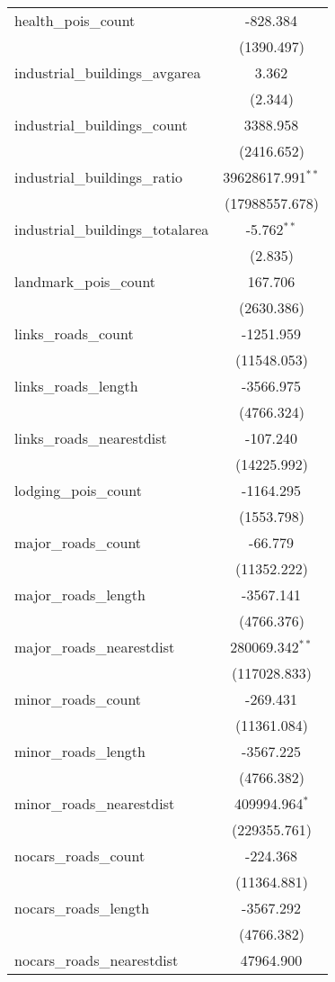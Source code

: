 \begin{table}[!htbp]
\begin{tabular}{@{\extracolsep{5pt}}lc}
 health_pois_count & -828.384$^{}$ \\
  & (1390.497) \\
 industrial_buildings_avgarea & 3.362$^{}$ \\
  & (2.344) \\
 industrial_buildings_count & 3388.958$^{}$ \\
  & (2416.652) \\
 industrial_buildings_ratio & 39628617.991$^{**}$ \\
  & (17988557.678) \\
 industrial_buildings_totalarea & -5.762$^{**}$ \\
  & (2.835) \\
 landmark_pois_count & 167.706$^{}$ \\
  & (2630.386) \\
 links_roads_count & -1251.959$^{}$ \\
  & (11548.053) \\
 links_roads_length & -3566.975$^{}$ \\
  & (4766.324) \\
 links_roads_nearestdist & -107.240$^{}$ \\
  & (14225.992) \\
 lodging_pois_count & -1164.295$^{}$ \\
  & (1553.798) \\
 major_roads_count & -66.779$^{}$ \\
  & (11352.222) \\
 major_roads_length & -3567.141$^{}$ \\
  & (4766.376) \\
 major_roads_nearestdist & 280069.342$^{**}$ \\
  & (117028.833) \\
 minor_roads_count & -269.431$^{}$ \\
  & (11361.084) \\
 minor_roads_length & -3567.225$^{}$ \\
  & (4766.382) \\
 minor_roads_nearestdist & 409994.964$^{*}$ \\
  & (229355.761) \\
 nocars_roads_count & -224.368$^{}$ \\
  & (11364.881) \\
 nocars_roads_length & -3567.292$^{}$ \\
  & (4766.382) \\
 nocars_roads_nearestdist & 47964.900$^{}$ \\

\end{tabular}
\end{table}

